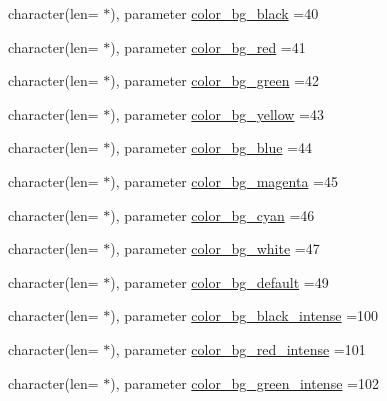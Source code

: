 \begin{DoxyCompactItemize}
\item 
character(len= $\ast$), parameter \mbox{\hyperlink{namespacem__escape_a5e4fc9941494a5c9518c84b434bfc97b}{color\+\_\+bg\+\_\+black}} =\textquotesingle{}40\textquotesingle{}
\item 
character(len= $\ast$), parameter \mbox{\hyperlink{namespacem__escape_ad219a6232dbaeb100a6e6cdc0365ee22}{color\+\_\+bg\+\_\+red}} =\textquotesingle{}41\textquotesingle{}
\item 
character(len= $\ast$), parameter \mbox{\hyperlink{namespacem__escape_a7c50b2b50909acf5935f9de7642d30f3}{color\+\_\+bg\+\_\+green}} =\textquotesingle{}42\textquotesingle{}
\item 
character(len= $\ast$), parameter \mbox{\hyperlink{namespacem__escape_a7bd0a1c173252170ccf6976b961fa1c3}{color\+\_\+bg\+\_\+yellow}} =\textquotesingle{}43\textquotesingle{}
\item 
character(len= $\ast$), parameter \mbox{\hyperlink{namespacem__escape_a699e7848c3c43f328168d59211d054cc}{color\+\_\+bg\+\_\+blue}} =\textquotesingle{}44\textquotesingle{}
\item 
character(len= $\ast$), parameter \mbox{\hyperlink{namespacem__escape_a73300e9f70a7abb1ec2a2bdb55194ae5}{color\+\_\+bg\+\_\+magenta}} =\textquotesingle{}45\textquotesingle{}
\item 
character(len= $\ast$), parameter \mbox{\hyperlink{namespacem__escape_a895ed90037352c2ce2be6353f6764cb8}{color\+\_\+bg\+\_\+cyan}} =\textquotesingle{}46\textquotesingle{}
\item 
character(len= $\ast$), parameter \mbox{\hyperlink{namespacem__escape_a26cfeb6eefc9cd1a2c9f419db077ecb1}{color\+\_\+bg\+\_\+white}} =\textquotesingle{}47\textquotesingle{}
\item 
character(len= $\ast$), parameter \mbox{\hyperlink{namespacem__escape_af84f93410fbe9fa8fea3b02ac9371833}{color\+\_\+bg\+\_\+default}} =\textquotesingle{}49\textquotesingle{}
\item 
character(len= $\ast$), parameter \mbox{\hyperlink{namespacem__escape_a80a991f9ee93243b6b9bea07f2ec6d03}{color\+\_\+bg\+\_\+black\+\_\+intense}} =\textquotesingle{}100\textquotesingle{}
\item 
character(len= $\ast$), parameter \mbox{\hyperlink{namespacem__escape_aff3cc89066b789384257efec08bf5123}{color\+\_\+bg\+\_\+red\+\_\+intense}} =\textquotesingle{}101\textquotesingle{}
\item 
character(len= $\ast$), parameter \mbox{\hyperlink{namespacem__escape_a9ee5d5f2d0522ca3ea194de4d9a05dc3}{color\+\_\+bg\+\_\+green\+\_\+intense}} =\textquotesingle{}102\textquotesingle{}

\end{DoxyCompactItemize}
